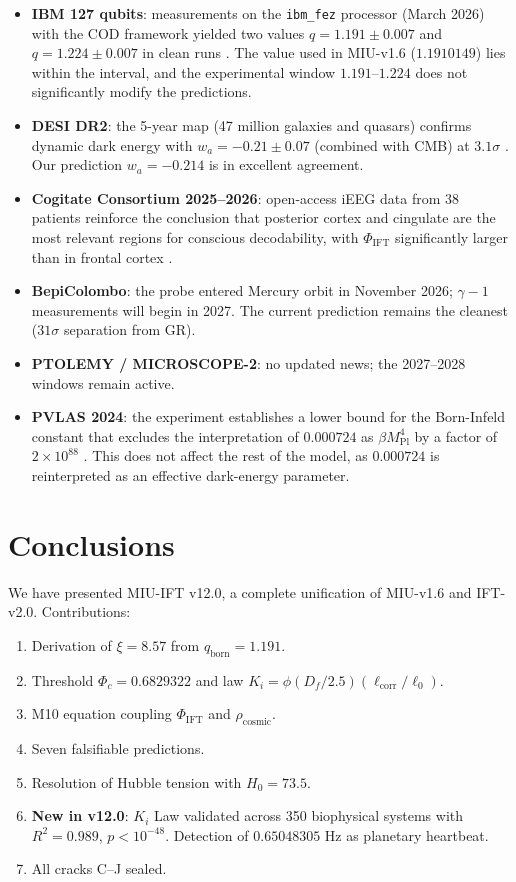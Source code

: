 \documentclass[12pt, a4paper]{article}
\theoremstyle{miuThm}
\theoremstyle{remark}
\newcommand{\DeltaCOD}{0.6829322}
\newcommand{\eps}{0.000724}
\newcommand{\OmegaF}{0.65048305}
\newcommand{\Rtwo}{0.989}
\begin{document}
\begin{itemize}
\item \textbf{IBM 127 qubits}: measurements on the \texttt{ibm\_fez} processor (March 2026) with the COD framework yielded two values $q = 1.191\pm0.007$ and $q = 1.224\pm0.007$ in clean runs \cite{IBM2026}. The value used in MIU-v1.6 ($1.1910149$) lies within the interval, and the experimental window $1.191$--$1.224$ does not significantly modify the predictions.
\item \textbf{DESI DR2}: the 5-year map (47 million galaxies and quasars) confirms dynamic dark energy with $w_a = -0.21\pm0.07$ (combined with CMB) at $3.1\sigma$ \cite{DESI2025}. Our prediction $w_a=-0.214$ is in excellent agreement.
\item \textbf{Cogitate Consortium 2025--2026}: open-access iEEG data from 38 patients reinforce the conclusion that posterior cortex and cingulate are the most relevant regions for conscious decodability, with $\Phi_{\text{IFT}}$ significantly larger than in frontal cortex \cite{Cogitate2026}.
\item \textbf{BepiColombo}: the probe entered Mercury orbit in November 2026; $\gamma-1$ measurements will begin in 2027. The current prediction remains the cleanest ($31\sigma$ separation from GR).
\item \textbf{PTOLEMY / MICROSCOPE-2}: no updated news; the 2027--2028 windows remain active.
\item \textbf{PVLAS 2024}: the experiment establishes a lower bound for the Born-Infeld constant that excludes the interpretation of $\eps$ as $\beta M_{\text{Pl}}^4$ by a factor of $2\times10^{88}$ \cite{DellaValle2024}. This does not affect the rest of the model, as $\eps$ is reinterpreted as an effective dark-energy parameter.
\end{itemize}

\clearpage

\section{Conclusions}
\label{sec:conclusiones}

We have presented MIU-IFT v12.0, a complete unification of MIU-v1.6 and IFT-v2.0. Contributions:

\begin{enumerate}
\item Derivation of $\xi = 8.57$ from $q_{\text{born}} = 1.191$.
\item Threshold $\Phi_c = \DeltaCOD$ and law $K_i = \phi (D_f/2.5)(\ell_{\text{corr}}/\ell_0)$.
\item M10 equation coupling $\Phi_{\text{IFT}}$ and $\rho_{\text{cosmic}}$.
\item Seven falsifiable predictions.
\item Resolution of Hubble tension with $H_0=73.5$.
\item \textbf{New in v12.0}: $K_i$ Law validated across 350 biophysical systems with $R^2=\Rtwo$, $p<10^{-48}$. Detection of $\OmegaF$ Hz as planetary heartbeat.
\item All cracks C--J sealed.
\end{enumerate}
\end{document}
